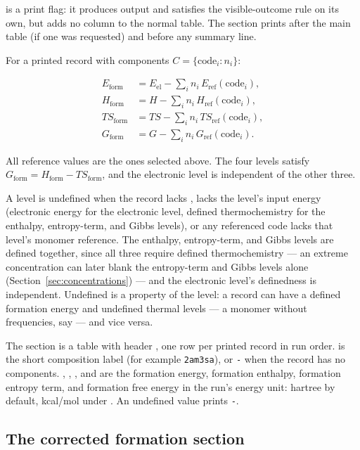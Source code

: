  is a print flag: it produces output and satisfies the
visible-outcome rule on its own, but adds no column to the normal table. The
section prints after the main table (if one was requested) and before any
summary line.

For a printed record with components $C = \{\text{code}_i : n_i\}$:

\begin{align}
E_{\mathrm{form}} &= E_{\mathrm{el}}
  - \sum_i n_i\,E_{\mathrm{ref}}(\text{code}_i),\\
H_{\mathrm{form}} &= H
  - \sum_i n_i\,H_{\mathrm{ref}}(\text{code}_i),\\
T S_{\mathrm{form}} &= T S
  - \sum_i n_i\,T S_{\mathrm{ref}}(\text{code}_i),\\
G_{\mathrm{form}} &= G
  - \sum_i n_i\,G_{\mathrm{ref}}(\text{code}_i).
\end{align}

All reference values are the ones selected above. The four levels satisfy
$G_{\mathrm{form}} = H_{\mathrm{form}} - T S_{\mathrm{form}}$, and the
electronic level is independent of the other three.

A level is undefined when the record lacks , lacks the
level's input energy (electronic energy for the electronic level, defined
thermochemistry for the enthalpy, entropy-term, and Gibbs levels), or any
referenced code lacks that level's monomer reference. The enthalpy,
entropy-term, and Gibbs levels are defined together, since all three require
defined thermochemistry — an extreme concentration can later blank the
entropy-term and Gibbs levels alone (Section~\ref{sec:concentrations}) —
and the electronic level's definedness is independent.
Undefined is a property of the level: a record can have a defined formation
energy and undefined thermal levels — a monomer without frequencies, say —
and vice versa.

The section is a table with header , one row per printed
record in run order.  is the short composition label (for example
\texttt{2am3sa}), or \texttt{-} when the record has no components.
, , , and  are the formation energy, formation
enthalpy, formation entropy term, and formation free energy in the run's
energy unit: hartree by default, kcal/mol under . An undefined
value prints \texttt{-}.

\subsection{The corrected formation section}\label{sec:corrected-formation}

